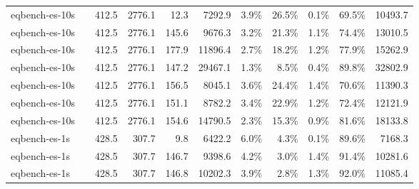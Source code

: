 \begin{tabular}{llrrrrrrrrr}
  \midrule
  {reporttablerow}\label{tabrow:tab-teralizer-stage-runtimes:eqbench-es-10s@3ABASELINE}eqbench-es-10s & \VariantBaseline{} & 412.5 & 2776.1 & 12.3 & 7292.9 & 3.9\% & 26.5\% & 0.1\% & 69.5\% & 10493.7 \\
  {reporttablerow}\label{tabrow:tab-teralizer-stage-runtimes:eqbench-es-10s@3ANAIVE_10_TRIES}eqbench-es-10s & \VariantNaiveA{} & 412.5 & 2776.1 & 145.6 & 9676.3 & 3.2\% & 21.3\% & 1.1\% & 74.4\% & 13010.5 \\
  {reporttablerow}\label{tabrow:tab-teralizer-stage-runtimes:eqbench-es-10s@3ANAIVE_50_TRIES}eqbench-es-10s & \VariantNaiveB{} & 412.5 & 2776.1 & 177.9 & 11896.4 & 2.7\% & 18.2\% & 1.2\% & 77.9\% & 15262.9 \\
  {reporttablerow}\label{tabrow:tab-teralizer-stage-runtimes:eqbench-es-10s@3ANAIVE_200_TRIES}eqbench-es-10s & \VariantNaiveC{} & 412.5 & 2776.1 & 147.2 & 29467.1 & 1.3\% & 8.5\% & 0.4\% & 89.8\% & 32802.9 \\
  {reporttablerow}\label{tabrow:tab-teralizer-stage-runtimes:eqbench-es-10s@3AIMPROVED_10_TRIES}eqbench-es-10s & \VariantImprovedA{} & 412.5 & 2776.1 & 156.5 & 8045.1 & 3.6\% & 24.4\% & 1.4\% & 70.6\% & 11390.3 \\
  {reporttablerow}\label{tabrow:tab-teralizer-stage-runtimes:eqbench-es-10s@3AIMPROVED_50_TRIES}eqbench-es-10s & \VariantImprovedB{} & 412.5 & 2776.1 & 151.1 & 8782.2 & 3.4\% & 22.9\% & 1.2\% & 72.4\% & 12121.9 \\
  {reporttablerow}\label{tabrow:tab-teralizer-stage-runtimes:eqbench-es-10s@3AIMPROVED_200_TRIES}eqbench-es-10s & \VariantImprovedC{} & 412.5 & 2776.1 & 154.6 & 14790.5 & 2.3\% & 15.3\% & 0.9\% & 81.6\% & 18133.8 \\
  \midrule
  {reporttablerow}\label{tabrow:tab-teralizer-stage-runtimes:eqbench-es-1s@3ABASELINE}eqbench-es-1s & \VariantBaseline{} & 428.5 & 307.7 & 9.8 & 6422.2 & 6.0\% & 4.3\% & 0.1\% & 89.6\% & 7168.3 \\
  {reporttablerow}\label{tabrow:tab-teralizer-stage-runtimes:eqbench-es-1s@3ANAIVE_10_TRIES}eqbench-es-1s & \VariantNaiveA{} & 428.5 & 307.7 & 146.7 & 9398.6 & 4.2\% & 3.0\% & 1.4\% & 91.4\% & 10281.6 \\
  {reporttablerow}\label{tabrow:tab-teralizer-stage-runtimes:eqbench-es-1s@3ANAIVE_50_TRIES}eqbench-es-1s & \VariantNaiveB{} & 428.5 & 307.7 & 146.8 & 10202.3 & 3.9\% & 2.8\% & 1.3\% & 92.0\% & 11085.4 \\

\end{tabular}
